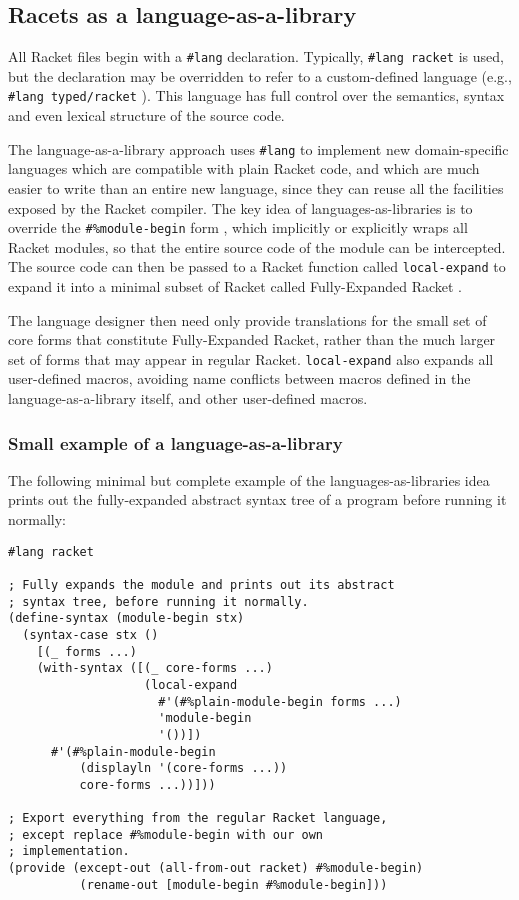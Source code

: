 \documentclass{article}
\begin{document}
\subsection{Racets as a language-as-a-library}
All Racket files begin with a \texttt{\#lang} declaration. Typically, \texttt{\#lang racket} is used, but the declaration may be overridden to refer to a custom-defined language (e.g., \texttt{\#lang typed/racket} \cite{typed-racket}). This language has full control over the semantics, syntax and even lexical structure of the source code.

The language-as-a-library approach \cite{lang-as-lib} uses \texttt{\#lang} to implement new domain-specific languages which are compatible with plain Racket code, and which are much easier to write than an entire new language, since they can reuse all the facilities exposed by the Racket compiler. The key idea of languages-as-libraries is to override the \texttt{\#\%module-begin} form , which implicitly or explicitly wraps all Racket modules, so that the entire source code of the module can be intercepted. The source code can then be passed to a Racket function called \texttt{local-expand} to expand it into a minimal subset of Racket called Fully-Expanded Racket \cite{fe-racket}.

The language designer then need only provide translations for the small set of core forms that constitute Fully-Expanded Racket, rather than the much larger set of forms that may appear in regular Racket. \texttt{local-expand} also expands all user-defined macros, avoiding name conflicts between macros defined in the language-as-a-library itself, and other user-defined macros.


\subsubsection{Small example of a language-as-a-library}
The following minimal but complete example of the languages-as-libraries idea prints out the fully-expanded abstract syntax tree of a program before running it normally:

\begin{lstlisting}
#lang racket

; Fully expands the module and prints out its abstract
; syntax tree, before running it normally.
(define-syntax (module-begin stx)
  (syntax-case stx ()
    [(_ forms ...)
    (with-syntax ([(_ core-forms ...)
                   (local-expand
                     #'(#%plain-module-begin forms ...)
                     'module-begin
                     '())])
      #'(#%plain-module-begin
          (displayln '(core-forms ...))
          core-forms ...))]))

; Export everything from the regular Racket language,
; except replace #%module-begin with our own
; implementation.
(provide (except-out (all-from-out racket) #%module-begin)
          (rename-out [module-begin #%module-begin]))
\end{lstlisting}
\end{document}
